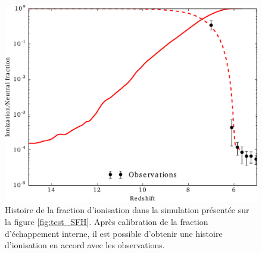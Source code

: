 \begin{figure}[bth]
        \includegraphics[width=.95\linewidth]{img/02/xion.pdf} 
        \caption{Histoire de la fraction d'ionisation dans la simulation présentée sur la figure \ref{fig:test_SFH}.
        Après calibration de la fraction d’échappement interne, il est possible d'obtenir une histoire d'ionisation en accord avec les observations.
 		\label{fig:test_xion}}
\end{figure}


%
%
%
%
